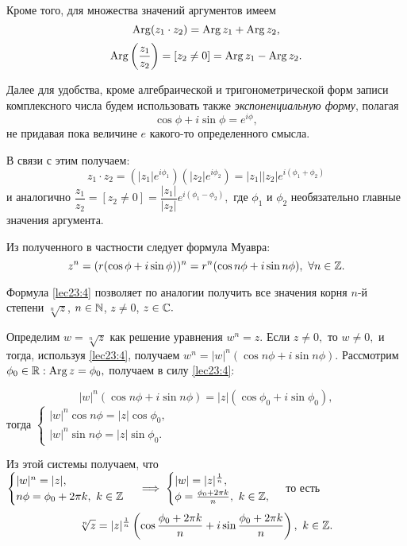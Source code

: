 \documentclass[../../main.tex]{subfiles}
\begin{document}
	Кроме того, для множества значений аргументов имеем 
	\[\operatorname{Arg} (z_1\cdot z_2) = \operatorname{Arg} z_1 + \operatorname{Arg} z_2,\]
	\[\operatorname{Arg} \left(\frac{z_1}{z_2}\right) =[z_2 \neq 0] = \operatorname{Arg} z_1 - \operatorname{Arg} z_2.\]
	
	Далее для удобства, кроме алгебраической и тригонометрической форм записи
	комплексного числа будем использовать также \emph{экспоненциальную форму},
	полагая \[\cos \phi + i \sin\phi = e^{i\phi},\] не придавая пока
	величине $e$ какого-то определенного смысла.
	
	В связи с этим получаем:
	\[z_1\cdot z_2 = \left(|z_1| e^{i{\phi}_1}\right)
	\left(|z_2| e^{i{\phi}_2}\right) = |z_1||z_2| e^{i({\phi}_1+{\phi}_2)} \]
	и аналогично $\dfrac{z_1}{z_2} =  [z_2 \neq 0] = \dfrac{|z_1|}{|z_2|} 
	e^{i({\phi}_1-{\phi}_2)},$ где ${\phi}_1$ и ${\phi}_2$ необязательно 
	главные значения аргумента.
	
	Из полученного в частности следует формула Муавра:
	\begin{equation}
	\label{lec23:4}
	z^n = (r(\cos \phi + i\sin \phi))^n = r^n(\cos n\phi + i\sin n\phi),\
    \forall n\in \mathbb{Z}.
	\end{equation}
	
	Формула \eqref{lec23:4} позволяет по аналогии получить все значения корня
	$n$-й степени $\sqrt[n]{z}$, $n\in\mathbb{N}$, $z\neq 0$, $z\in \mathbb{C}.$
	
	Определим $w = \sqrt[n]{z}$  как решение уравнения $w^n = z.$ Если 
	$z\neq 0,$ то $w\neq 0,$ и тогда, используя \eqref{lec23:4}, получаем
	$w^n = |w|^n(\cos n\phi + i\sin n\phi).$ Рассмотрим ${\phi}_0\in\mathbb{R}:
	\operatorname{Arg} z = {\phi}_0,$ получаем в силу  \eqref{lec23:4}:
	
	\begin{equation}
	\label{lec23:5}
	|w|^n (\cos n\phi + i\sin n\phi) = |z| (\cos {\phi}_0 + i\sin {\phi}_0),
	\end{equation}
	тогда $\begin{cases} 
	|w|^n \cos n\phi =  |z| \cos {\phi}_0,\\
	|w|^n \sin n\phi  = |z| \sin {\phi}_0.
	\end{cases}$
	
	Из этой системы получаем, что 
	$\begin{cases} 
	|w|^n =  |z|,\\
	n\phi  = {\phi}_0 + 2\pi k,\ k\in\mathbb{Z}
	\end{cases} \implies 
	\begin{cases} 
	|w| =  |z|^{\frac{1}{n}},\\
	\phi  = \frac{{\phi}_0 + 2\pi k}{n},\ k\in\mathbb{Z},
	\end{cases}$ то есть \begin{equation}
	\label{lec23:6}
	\sqrt[n]{z} = |z|^{\frac{1}{n}}\left(\cos\frac{{\phi}_0 + 2\pi k}{n}
	 + i\sin \frac{{\phi}_0 + 2\pi k}{n} \right),\ k\in\mathbb{Z}.
	\end{equation}
	
\end{document}
